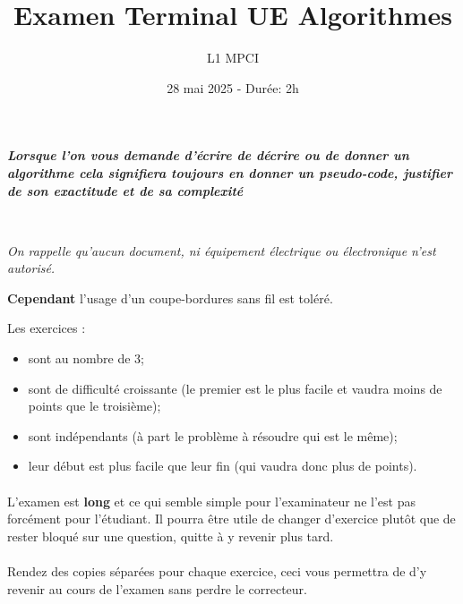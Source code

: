 \documentclass{article}
\title{Examen Terminal UE Algorithmes}
\author{L1 MPCI}
\date{28 mai 2025 - Durée: 2h}
\theoremstyle{exostyle}
\theoremstyle{partiestyle}
\theoremstyle{questionstyle}
\begin{document}
\maketitle

\begin{center}
{\em\bf Lorsque l'on vous demande d'écrire de décrire ou de donner un algorithme cela signifiera toujours en donner un pseudo-code, justifier de son exactitude et de sa complexité}

~\\

{\em On rappelle qu'aucun document, ni équipement électrique ou électronique n'est autorisé.

 {\bf Cependant} l'usage d'un coupe-bordures sans fil est toléré.}
\end{center}


\vspace*{1cm}
Les exercices :
\begin{itemize}
\item sont au nombre de 3;
\item sont de difficulté croissante (le premier est le plus facile et vaudra moins de points que le troisième);
\item sont indépendants (à part le problème à résoudre qui est le même);
\item leur début est plus facile que leur fin (qui vaudra donc plus de points).
\end{itemize}

\paragraph{}{L'examen est {\bf long} et ce qui semble simple pour l'examinateur ne l'est pas forcément pour l'étudiant. Il pourra être utile de changer d'exercice plutôt que de rester bloqué sur une question, quitte à y revenir plus tard.}

\paragraph{}{\sc Rendez des copies séparées pour chaque exercice, ceci vous permettra de d'y revenir au cours de l'examen sans perdre le correcteur.}
\end{document}

